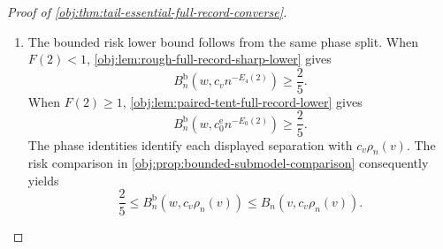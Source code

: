 \begin{proof}[Proof of \cref{obj:thm:tail-essential-full-record-converse}]
\begin{enumerate}
In the rough phase, \cref{obj:lem:rough-full-record-sharp-lower} supplies
\[
\begin{gathered}
\operatorname{supp}_+(\pi^{\mathrm b}_{0,n,v})
\subseteq H_0^{\mathrm b}(w),\\
\operatorname{supp}_+(\pi^{\mathrm b}_{1,n,v})
\subseteq
\{P\in\mathcal M_w^{\mathrm b}:
c_vn^{-E_4(2)}\le d(P)<d_0\}.
\end{gathered}
\]
By the phase identity, \(\rho_n(v)=n^{-E_4(2)}\).
The model inclusion of \cref{obj:prop:bounded-submodel-comparison}
preserves the effect, and the null constancy condition is the same in
both models. Hence
\[
\begin{gathered}
\operatorname{supp}_+(\pi^{\mathrm b}_{0,n,v})\subseteq H_0(v),\\
\operatorname{supp}_+(\pi^{\mathrm b}_{1,n,v})
\subseteq
\{P\in\mathcal M_v:c_v\rho_n(v)\le d(P)\}.
\end{gathered}
\]

In the complementary phase \(F(2)\ge1\), the selected bounded priors are
the signed-binary paired-tent priors. To identify their null support,
define the balanced deterministic zero-effect law by
\[
P_{\mathrm{zero}}(dx,dA,dy)
=
\lambda(dx)\,
\frac{\delta_0+\delta_1}{2}(dA)\,
\delta_0(dy).
\]
It has propensity \(1/2\), baseline mean zero, and effect zero. Its
smoothness conditions hold because these functions are constant, and
its raw moment is zero. Its signed-binary conversion from
\cref{obj:prop:bounded-submodel-comparison} is
\[
P_{\mathrm{zero}}^{\mathrm{bin}}(dx,dA,dy)
=
\lambda(dx)\,
\frac{\delta_0+\delta_1}{2}(dA)\,
\frac{\delta_{-1}+\delta_1}{2}(dy).
\]
This conversion preserves the means and effect, and its conditional
second moment is one. Thus
\(P_{\mathrm{zero}}^{\mathrm{bin}}\in H_0(v)\).
Every selected null sign configuration gives precisely this law, so
\[
\operatorname{supp}_+(\pi^{\mathrm b}_{0,n,v})
\subseteq\{P_{\mathrm{zero}}^{\mathrm{bin}}\}\subseteq H_0(v).
\]
For the alternatives,
\cref{obj:lem:paired-tent-full-record-lower} and
\cref{obj:prop:bounded-submodel-comparison} give original-model
membership and
\[
d(P)\ge c_0^{\mathrm e}n^{-E_0(2)}
=c_v\rho_n(v)
\qquad
(P\in\operatorname{supp}_+(\pi^{\mathrm b}_{1,n,v})).
\]
This proves the original-model support conclusions in both phases.

\item
The bounded risk lower bound follows from the same phase split.
When \(F(2)<1\),
\cref{obj:lem:rough-full-record-sharp-lower} gives
\[
B_n^{\mathrm b}(w,c_vn^{-E_4(2)})\ge\frac25.
\]
When \(F(2)\ge1\),
\cref{obj:lem:paired-tent-full-record-lower} gives
\[
B_n^{\mathrm b}(w,c_0^{\mathrm e}n^{-E_0(2)})\ge\frac25.
\]
The phase identities identify each displayed separation with
\(c_v\rho_n(v)\). The risk comparison in
\cref{obj:prop:bounded-submodel-comparison} consequently yields
\[
\frac25
\le B_n^{\mathrm b}(w,c_v\rho_n(v))
\le B_n(v,c_v\rho_n(v)).
\]


\end{enumerate}
\end{proof}
